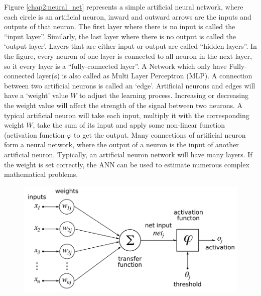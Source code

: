 Figure \ref{chap2:neural_net} represents a simple artificial neural network, where each circle is an artificial neuron, inward and outward arrows are the inputs and outputs of that neuron. The first layer where there is no input is called the “input layer”. Similarly, the last layer where there is no output is called the ‘output layer’. Layers that are either input or output are called “hidden layers”. In the figure, every neuron of one layer is connected to all neuron in the next layer, so it every layer is a “fully-connected layer”. A Network which only have Fully-connected layer(s) is also called as Multi Layer Perceptron (MLP). A connection between two artificial neurons is called an ‘edge’. Artificial neurons and edges will have a ‘weight’ value \boldmath$W$ to adjust the learning process. Increasing or decreasing the weight value will affect the strength of the signal between two neurons. A typical artificial neuron will take each input, multiply it with the corresponding weight \boldmath$W$, take the sum of its input and apply some non-linear function (activation function \boldmath$\varphi$ to get the output. Many connections of artificial neuron form a neural network, where the output of a neuron is the input of another artificial neuron. Typically, an artificial neuron network will have many layers. If the weight is set correctly, the ANN can be used to estimate numerous complex mathematical problems.

\begin{center}
	\begin{figure}[H]
		\centering
		\includegraphics[width=0.75\columnwidth]{images/chap2/ANN_detail.png}
		\label{chap2:neural_net_detail}
		
	\end{figure}
\end{center}



